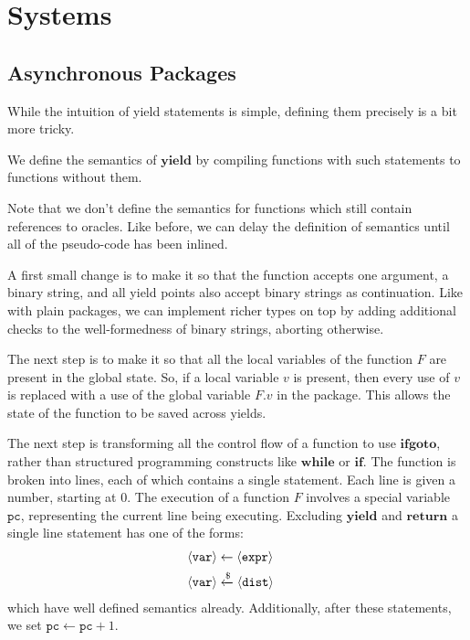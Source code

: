 \section{Systems}

\subsection{Asynchronous Packages}

While the intuition of yield statements is simple, defining
them precisely is a bit more tricky.

\begin{definition}
\label{def:yield}
We define the semantics of $\textbf{yield}$ by compiling functions with
such statements to functions without them.

Note that we don't define the semantics for functions which still contain references
to oracles.
Like before, we can delay the definition of semantics until all of the
pseudo-code has been inlined.

A first small change is to make it so that the function accepts one
argument, a binary string, and all yield points also accept binary
strings as continuation.
Like with plain packages, we can implement richer types on top by adding
additional checks to the well-formedness of binary strings, aborting
otherwise.

The next step is to make it so that all the local variables of the function $F$
are present in the global state.
So, if a local variable $v$ is present, then every use
of $v$ is replaced with a use of the global variable $F.v$ in the package.
This allows the state of the function to be saved across yields.

The next step is transforming all the control flow of a function to
use $\textbf{ifgoto}$, rather than structured programming constructs like
$\textbf{while}$ or $\textbf{if}$.
The function is broken into lines, each of which contains a single statement.
Each line is given a number, starting at $0$.
The execution of a function $F$ involves a special variable $\texttt{pc}$,
representing the current line being executing.
Excluding $\textbf{yield}$ and $\textbf{return}$ a single line statement has one of the
forms:
$$
\begin{aligned}
&\langle \texttt{var} \rangle \gets \langle \texttt{expr} \rangle\cr
&\langle \texttt{var} \rangle \xleftarrow{\$} \langle \texttt{dist} \rangle\cr
\end{aligned}
$$
which have well defined semantics already.
Additionally, after these statements, we set $\texttt{pc} \gets \texttt{pc} + 1$.


\end{definition}
